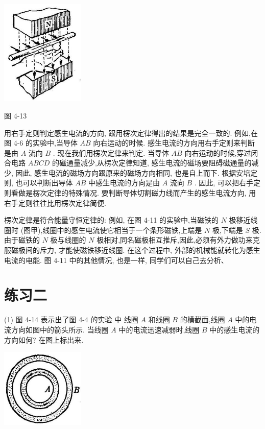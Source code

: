 \documentclass[10pt]{article}
\begin{document}
\begin{center}
\includegraphics[max width=0.3\textwidth]{images/01913056-1f15-74d8-9184-9aab52c9d66b_140_105227.jpg}
\end{center}

图 4-13

用右手定则判定感生电流的方向, 跟用楞次定律得出的结果是完全一致的. 例如,在图 4-6 的实验中,当导体 \({AB}\) 向右运动的时候. 感生电流的方向用右手定则来判断是由 \(A\) 流向 \(B\) . 现在我们用楞次定律来判定. 当导体 \({AB}\) 向右运动的时候,穿过闭合电路 \({ABCD}\) 的磁通量减少,从楞次定律知道, 感生电流的磁场要阻碍磁通量的减少, 因此, 感生电流的磁场方向跟原来的磁场方向相同, 也是自上而下. 根据安培定则, 也可以判断出导体 \({AB}\) 中感生电流的方向是由 \(A\) 流向 \(B\) . 因此, 可以把右手定则看做是楞次定律的特殊情况. 要判断导体切割磁力线而产生的感生电流方向, 用右手定则往往比用楞次定律简便.

楞次定律是符合能量守恒定律的: 例如, 在图 4-11 的实验中,当磁铁的 \(N\) 极移近线圈时 (图甲),线圈中的感生电流使它相当于一个条形磁铁,上端是 \(N\) 极,下端是 \(S\) 极. 由于磁铁的 \(N\) 极与线圈的 \(N\) 极相对,同名磁极相互推斥,因此,必须有外力做功来克服磁极间的斥力, 才能使磁铁移近线圈. 在这个过程中, 外部的机械能就转化为感生电流的电能. 图 4-11 中的其他情况, 也是一样, 同学们可以自己去分析、

\section*{练习二}

(1) 图 4-14 表示出了图 4-4 的实验 中 线圈 \(A\) 和线圈 \(B\) 的横截面,线圈 \(A\) 中的电流方向如图中的箭头所示. 当线圈 \(A\) 中的电流迅速减弱时,线圈 \(B\) 中的感生电流的方向如何? 在图上标出来.

\begin{center}
\includegraphics[max width=0.3\textwidth]{images/01913056-1f15-74d8-9184-9aab52c9d66b_141_434840.jpg}
\end{center}
\end{document}
